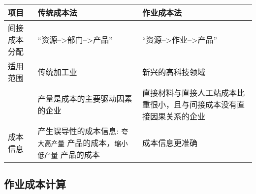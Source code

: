 \documentclass[11pt]{article}
\begin{document}
\begin{center}
\begin{tabular}{lll}
项目 & 传统成本法 & 作业成本法\\
\hline
间接成本分配 & ``资源-->部门-->产品'' & ``资源-->作业-->产品''\\
适用范围 & 传统加工业 & 新兴的高科技领域\\
 & 产量是成本的主要驱动因素的企业 & 直接材料与直接人工站成本比重很小，且与间接成本没有直接因果关系的企业\\
成本信息 & 产生误导性的成本信息: \texttt{夸大高产量} 产品的成本，\texttt{缩小低产量} 产品的成本 & 成本信息更准确\\
\end{tabular}
\end{center}
\subsection{作业成本计算}
\label{sec:org5c49d5c}
\end{document}
